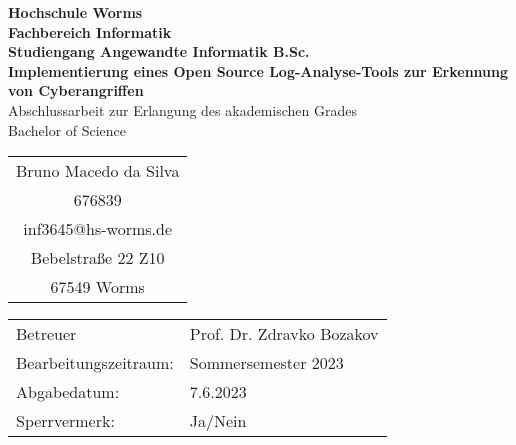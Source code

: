 \begin{titlepage}
    \vspace*{2mm}
    \begin{center}
        \Large
        \textbf{Hochschule Worms}\\
        \textbf{Fachbereich Informatik}\\
        \textbf{Studiengang Angewandte Informatik B.Sc.}\\
        \vspace{2.5cm}
        \textbf{Implementierung eines Open Source Log-Analyse-Tools zur Erkennung von Cyberangriffen}\\
        \vspace{1cm}
        \large
        Abschlussarbeit zur Erlangung des akademischen Grades \\
        Bachelor of Science
        \vspace{2cm}
        \begin {table}[ht]
        \centering
            \begin{tabular}{c}
                Bruno Macedo da Silva  \\ 
                676839                \\
                inf3645@hs-worms.de   \\
                Bebelstraße 22 Z10    \\
                67549 Worms            \\
            \end{tabular}
        \end {table}
        \vspace{1.5cm}
        \large
        \vspace{1cm}
        \begin{table}[h]
            \centering
            \begin{tabular}{l l}
                Betreuer                  & Prof. Dr. Zdravko Bozakov \\
                Bearbeitungszeitraum:     & Sommersemester 2023 \\
                Abgabedatum:              & 7.6.2023 \\
                Sperrvermerk:             & Ja/Nein \\
            \end{tabular}
        \end{table}    
    \end{center}
    \normalsize
    \vfill
\end{titlepage}